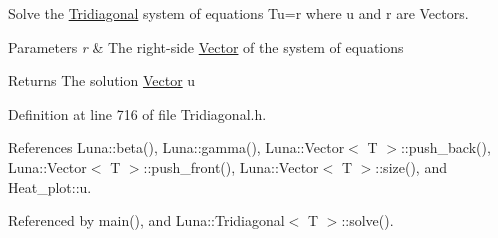 Solve the \hyperlink{classLuna_1_1Tridiagonal}{Tridiagonal} system of equations Tu=r where u and r are Vectors. 


\begin{DoxyParams}{Parameters}
{\em r} & The right-\/side \hyperlink{classLuna_1_1Vector}{Vector} of the system of equations \\
\hline
\end{DoxyParams}
\begin{DoxyReturn}{Returns}
The solution \hyperlink{classLuna_1_1Vector}{Vector} u 
\end{DoxyReturn}


Definition at line 716 of file Tridiagonal.\+h.



References Luna\+::beta(), Luna\+::gamma(), Luna\+::\+Vector$<$ T $>$\+::push\+\_\+back(), Luna\+::\+Vector$<$ T $>$\+::push\+\_\+front(), Luna\+::\+Vector$<$ T $>$\+::size(), and Heat\+\_\+plot\+::u.



Referenced by main(), and Luna\+::\+Tridiagonal$<$ T $>$\+::solve().



